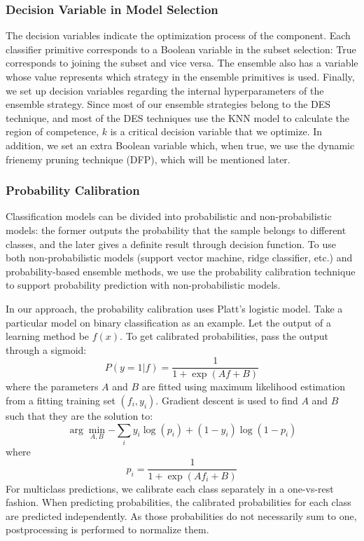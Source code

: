 \documentclass[review]{elsarticle}
\begin{document}
\subsubsection{Decision Variable in Model Selection}
The decision variables indicate the optimization process of the component. Each classifier primitive corresponds to a Boolean variable in the subset selection: True corresponds to joining the subset and vice versa. The ensemble also has a variable whose value represents which strategy in the ensemble primitives is used. Finally, we set up decision variables regarding the internal hyperparameters of the ensemble strategy. Since most of our ensemble strategies belong to the DES technique, and most of the DES techniques use the KNN model to calculate the region of competence, $ k $ is a critical decision variable that we optimize. In addition, we set an extra Boolean variable which, when true, we use the dynamic frienemy pruning technique (DFP)\cite{oliveira2017online}, which will be mentioned later.
\subsubsection{Probability Calibration}
Classification models can be divided into probabilistic and non-probabilistic models: the former outputs the probability that the sample belongs to different classes, and the later gives a definite result through decision function. To use both non-probabilistic models (support vector machine, ridge classifier, etc.) and probability-based ensemble methods\cite{woloszynski2012measure}\cite{didaci2005study}\cite{woloszynski2011probabilistic}, we use the probability calibration technique \cite{niculescu2005predicting} to support probability prediction with non-probabilistic models.

In our approach, the probability calibration uses Platt's logistic model. Take a particular model on binary classification as an example. Let the output of a learning method be $ f(x) $. To get calibrated probabilities, pass the output through a sigmoid:
\begin{equation}\label{eq4}
	P(y=1|f)=\frac{1}{1+\exp(Af+B)}
\end{equation} where the parameters $ A $ and $ B $ are fitted using maximum likelihood estimation from a fitting training set $(f_i,y_i)$. Gradient descent is used to find $ A $ and $ B $ such that they are the solution to:
\begin{equation}\label{eq5}
	\arg\min_{A,B}{-\sum_iy_i\log(p_i)+(1-y_i)\log(1-p_i)}
\end{equation} where
\begin{equation}\label{eq6}
	p_i=\frac{1}{1+\exp(Af_i+B)}
\end{equation}
For multiclass predictions, we calibrate each class separately in a one-vs-rest fashion. When predicting probabilities, the calibrated probabilities for each class are predicted independently. As those probabilities do not necessarily sum to one, postprocessing is performed to normalize them.
\end{document}
